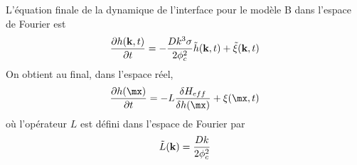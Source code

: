L'équation finale de la dynamique de l'interface pour le modèle B dans l'espace de Fourier est
\begin{align}
    \frac{\partial h({\bf k},t)}{\partial t} = -\frac{Dk^3\sigma}{2\phi_c^2} \tilde h({\bf k},t) + \tilde \xi({\bf k},t)
    \label{modBFT}
\end{align}
On obtient au final, dans l'espace réel, 
\begin{align}
    \frac{\partial h(\mx)}{\partial t}= -L \frac{\delta H_{eff}}{\delta h (\mx)} + \xi(\mx,t)
\end{align}
où l'opérateur $L$ est défini dans l'espace de Fourier par
\begin{align}
    \tilde L({\bf k}) = \frac{Dk}{2\phi_c^2}
    \label{op-mb}
\end{align}
%

